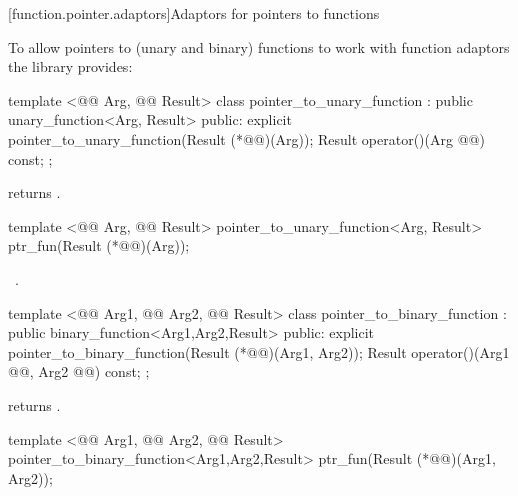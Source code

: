 \documentclass[american,twoside]{book}
\begin{document}
[function.pointer.adaptors]{Adaptors for pointers to functions}

\pnum
To allow pointers to (unary and binary) functions to work with function adaptors
the library provides:

%
\begin{itemdecl}
template <@@ Arg, @@ Result>
class pointer_to_unary_function : public unary_function<Arg, Result> {
public:
  explicit pointer_to_unary_function(Result (*@@)(Arg));
  Result operator()(Arg @@) const;
};
\end{itemdecl}

\begin{itemdescr}
\pnum
{} returns .
\end{itemdescr}

%
\begin{itemdecl}
template <@@ Arg, @@ Result>
  pointer_to_unary_function<Arg, Result> ptr_fun(Result (*@@)(Arg));
\end{itemdecl}

\begin{itemdescr}
\pnum
\returns\ 
.
\end{itemdescr}

%
\begin{itemdecl}
template <@@ Arg1, @@ Arg2, @@ Result>
class pointer_to_binary_function :
  public binary_function<Arg1,Arg2,Result> {
public:
  explicit pointer_to_binary_function(Result (*@@)(Arg1, Arg2));
  Result operator()(Arg1 @\farg{x}@, Arg2 @\farg{y}@) const;
};
\end{itemdecl}

\begin{itemdescr}
\pnum
{} returns .
\end{itemdescr}

%
\begin{itemdecl}
template <@@ Arg1, @@ Arg2, @@ Result>
  pointer_to_binary_function<Arg1,Arg2,Result>
    ptr_fun(Result (*@@)(Arg1, Arg2));
\end{itemdecl}
\end{document}
